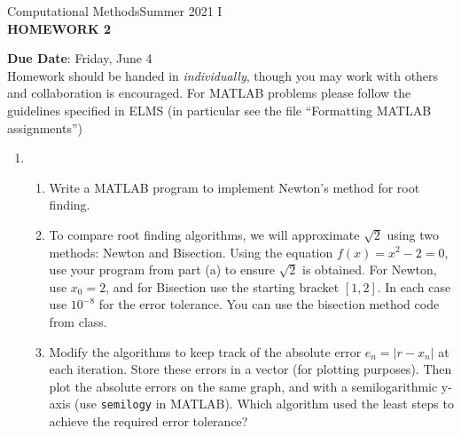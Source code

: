 \documentclass[12pt]{article}
\begin{document}
\begin{center}
Computational Methods\qquad Summer 2021 I
\\

\textbf{\large HOMEWORK 2}\\
\end{center}
\noindent \textbf{Due Date}: Friday, June 4\\

\noindent Homework should be handed in \emph{individually}, though you may work with others and collaboration is encouraged. For MATLAB problems please follow the guidelines specified in ELMS (in particular see the file ``Formatting MATLAB assignments'')

\begin{enumerate}\item
\begin{enumerate}
	\item Write a MATLAB program to implement Newton's method for root finding.
	\item To compare root finding algorithms, we will approximate $\sqrt{2}$ using two methods: Newton and Bisection. Using the equation $f(x)=x^2-2=0$, use your program from part (a) to ensure $\sqrt{2}$ is obtained. For Newton, use $x_0=2$, and for Bisection use the starting bracket $[1,2]$. In each case use $10^{-8}$ for the error tolerance. You can use the bisection method code from class.
	\item Modify the algorithms to keep track of the absolute error $e_n = |r - x_n|$ at each iteration. Store these errors in a vector (for plotting purposes). Then plot the absolute errors on the same graph, and with a semilogarithmic y-axis (use \texttt{semilogy} in MATLAB). Which algorithm used the least steps to achieve the required error tolerance?
	\end{enumerate}
\end{enumerate}
\end{document}

